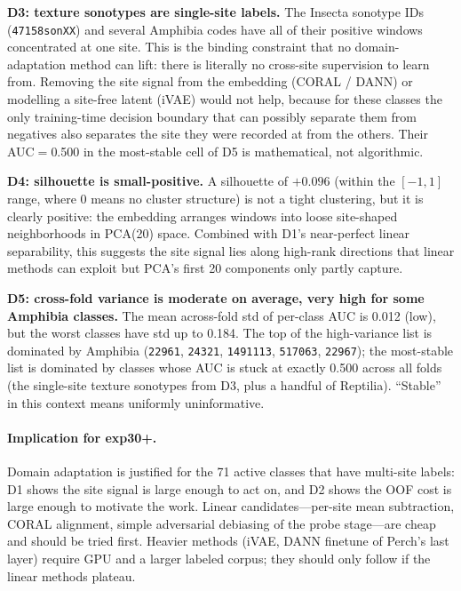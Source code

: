\textbf{D3: texture sonotypes are single-site labels.} The Insecta
sonotype IDs (\texttt{47158sonXX}) and several Amphibia codes have all
of their positive windows concentrated at one site. This is the
binding constraint that no domain-adaptation method can lift: there
is literally no cross-site supervision to learn from. Removing the
site signal from the embedding (CORAL / DANN) or modelling a site-free
latent (iVAE) would not help, because for these classes the only
training-time decision boundary that can possibly separate them from
negatives also separates the site they were recorded at from the
others. Their AUC$=$0.500 in the most-stable cell of D5 is mathematical,
not algorithmic.

\textbf{D4: silhouette is small-positive.} A silhouette of $+0.096$
(within the $[-1, 1]$ range, where 0 means no cluster structure) is
not a tight clustering, but it is clearly positive: the embedding
arranges windows into loose site-shaped neighborhoods in PCA(20)
space. Combined with D1's near-perfect linear separability, this
suggests the site signal lies along high-rank directions that linear
methods can exploit but PCA's first 20 components only partly capture.

\textbf{D5: cross-fold variance is moderate on average, very high for
some Amphibia classes.} The mean across-fold std of per-class AUC is
0.012 (low), but the worst classes have std up to 0.184. The top of
the high-variance list is dominated by Amphibia
(\texttt{22961}, \texttt{24321}, \texttt{1491113}, \texttt{517063},
\texttt{22967}); the most-stable list is dominated by classes whose
AUC is stuck at exactly 0.500 across all folds (the single-site
texture sonotypes from D3, plus a handful of Reptilia). ``Stable''
in this context means uniformly uninformative.

\paragraph{Implication for exp30+.}
Domain adaptation is justified for the 71 active classes that have
multi-site labels: D1 shows the site signal is large enough to act on,
and D2 shows the OOF cost is large enough to motivate the work. Linear
candidates---per-site mean subtraction, CORAL alignment, simple
adversarial debiasing of the probe stage---are cheap and should be
tried first. Heavier methods (iVAE, DANN finetune of Perch's last
layer) require GPU and a larger labeled corpus; they should only
follow if the linear methods plateau.

